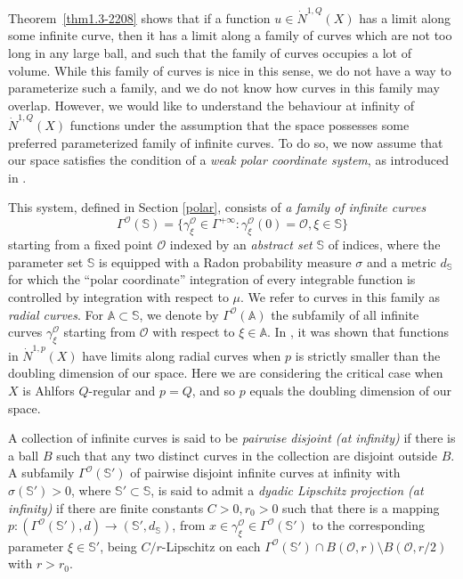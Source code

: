 \documentclass[10pt]{amsart}
\numberwithin{equation}{section}
\begin{document}
Theorem~\ref{thm1.3-2208} shows that if a function $u\in\dot N^{1,Q}(X)$ has a limit along some infinite curve, then it has a limit along a family of curves which are not too long in any large ball, and such that the family of curves occupies a lot of volume.  While this family of curves is nice in this sense, we 
do not have a way to parameterize such a family, and we do not know how curves in this family may overlap. However, we would like to understand the behaviour at infinity of $\dot N^{1,Q}(X)$ functions under the assumption that the space possesses some preferred parameterized family of infinite curves.  To do so, we now assume that our space satisfies the  condition of a {\it weak polar coordinate system}, as introduced in \cite{KN22}.{
This system, defined in Section \ref{polar}, consists of \emph{a family of infinite curves}
\[
\Gamma^{\mathcal O}(\mathbb S)=\{\gamma^{\mathcal O}_\xi\in\Gamma^{+\infty}: \gamma_\xi^{\mathcal O}(0)=\mathcal O, \xi\in\mathbb S\}
\]
starting from a fixed point $\mathcal{O}$ indexed by an \emph{abstract set}{
$\mathbb{S}$ of indices}, where the parameter set $\mathbb{S}$ is equipped with a Radon probability measure $\sigma$ and a metric $d_{\mathbb S}$ for which the ``polar coordinate'' integration of every integrable function is controlled by integration with respect to $\mu$. 
We refer to curves in this family as {\it radial curves}. For $\mathbb A\subset\mathbb S$, we denote by $\Gamma^{\mathcal O}(\mathbb A)$ the subfamily of all infinite curves $\gamma_\xi^{\mathcal O}$ starting from $\mathcal O$ with respect to $\xi\in\mathbb A$.
 In \cite{KN22,EKN22}, it was shown that functions in $\dot N^{1,p}(X)$ have limits along radial curves when $p$ is strictly smaller than the doubling dimension of our space.  Here we are considering the critical case when  $X$ is Ahlfors $Q$-regular and $p=Q$, and so $p$ equals the doubling dimension of our space. 

A collection of infinite curves is said to be  \emph{pairwise disjoint (at infinity)}  if there is a ball $B$ such that any two distinct curves in the collection are disjoint outside $B$.
A subfamily $\Gamma^{\mathcal O}(\mathbb S')$  of pairwise disjoint infinite curves at infinity with $\sigma(\mathbb S')>0$, where $\mathbb S'\subset\mathbb S$, is said to admit a \emph{dyadic Lipschitz projection (at infinity)}  if  there are finite constants $C>0, r_0>0$ such that   there is a  mapping $p: (\Gamma^{\mathcal O}(\mathbb S'), d)\to (\mathbb S', d_{\mathbb S})$, from $x\in\gamma_\xi^{\mathcal O}\in \Gamma^{\mathcal O}(\mathbb S')$ to the corresponding parameter $\xi\in\mathbb S'$,  being  $C/r$-Lipschitz on each  $\Gamma^{\mathcal O}(\mathbb S')\cap B(\mathcal O,r)\setminus B(\mathcal O,r/2)$ with $r>r_0$. 

}
\end{document}
